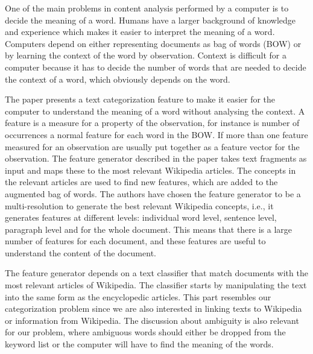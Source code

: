 \documentclass[english,a4paper]{ifimaster}
\begin{document}
One of the main problems in  content analysis performed by a computer is to decide the meaning of a word. Humans have a larger background of knowledge and experience which makes it easier to interpret the meaning of a word. Computers depend on either representing documents as bag of words (BOW) or by learning the context of the word by observation. Context is difficult for a computer because it has to decide the number of words that are needed to decide the context of a word, which obviously depends on the word. 



The paper presents a text categorization feature to make it easier for the computer to understand the meaning of a word without analysing the context. A feature is a measure for a property of the observation, for instance is number of occurrences a normal feature for each word in the  BOW. If more than one feature measured for an observation are  usually put together as a feature vector for the observation. The feature generator described in the paper takes text fragments as input and maps these to the most relevant Wikipedia articles. The concepts in the relevant articles are used to find new features, which are added to the augmented bag of words. The authors have chosen the feature generator to be a multi-resolution to generate the best relevant Wikipedia concepts, i.e., it generates features at different levels: individual word level, sentence level, paragraph level and for the whole document. This means that there is a large number of features for each document, and these features are useful to understand the content of the document. 

The feature generator depends on  a text classifier that match documents with the most relevant articles of Wikipedia. The classifier starts by manipulating the text into the same form as the encyclopedic articles. This part resembles our categorization problem since we are also interested in linking texts to Wikipedia or information from Wikipedia.  The discussion about ambiguity is also relevant for our problem, where ambiguous words should either be dropped from the keyword list or the computer will have to find the meaning of the words. 
\end{document}
